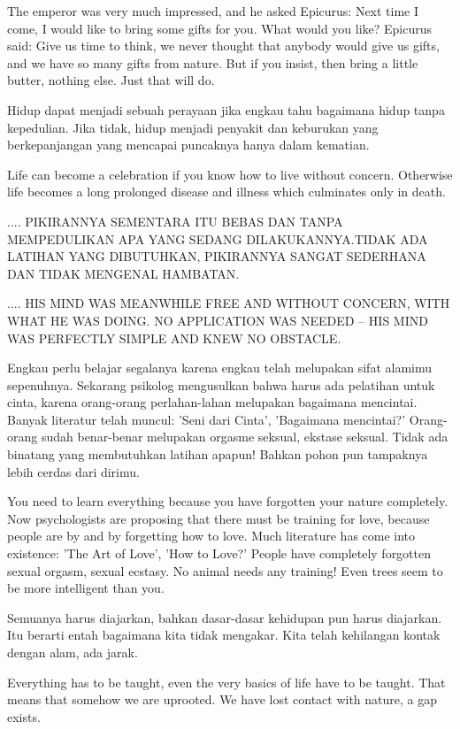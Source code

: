 \english
The emperor was very much impressed, and he asked Epicurus: Next time I come, I would like to bring some gifts for you. What would you like? Epicurus said: Give us time to think, we never thought that anybody would give us gifts, and we have so many gifts from nature. But if you insist, then bring a little butter, nothing else. Just that will do.

\bahasa
Hidup dapat menjadi sebuah perayaan jika engkau tahu bagaimana hidup tanpa kepedulian. Jika tidak, hidup menjadi penyakit dan keburukan yang berkepanjangan yang mencapai puncaknya hanya dalam kematian.

\english
Life can become a celebration if you know how to live without concern. Otherwise life becomes a long prolonged disease and illness which culminates only in death.

\bahasa
.... PIKIRANNYA SEMENTARA ITU BEBAS DAN TANPA MEMPEDULIKAN APA YANG SEDANG DILAKUKANNYA.TIDAK ADA LATIHAN YANG DIBUTUHKAN, PIKIRANNYA SANGAT SEDERHANA DAN TIDAK MENGENAL HAMBATAN.

\english
.... HIS MIND WAS MEANWHILE FREE AND WITHOUT CONCERN, WITH WHAT HE WAS DOING. NO APPLICATION WAS NEEDED – HIS MIND WAS PERFECTLY SIMPLE AND KNEW NO OBSTACLE.

\bahasa
Engkau perlu belajar segalanya karena engkau telah melupakan sifat alamimu sepenuhnya. Sekarang psikolog mengusulkan bahwa harus ada pelatihan untuk cinta, karena orang-orang perlahan-lahan melupakan bagaimana mencintai. Banyak literatur telah muncul: 'Seni dari Cinta', 'Bagaimana mencintai?' Orang-orang sudah benar-benar melupakan orgasme seksual, ekstase seksual. Tidak ada binatang yang membutuhkan latihan apapun! Bahkan pohon pun tampaknya lebih cerdas dari dirimu.


\english
You need to learn everything because you have forgotten your nature completely. Now psychologists are proposing that there must be training for love, because people are by and by forgetting how to love. Much literature has come into existence: 'The Art of Love', 'How to Love?' People have completely forgotten sexual orgasm, sexual ecstasy. No animal needs any training! Even trees seem to be more intelligent than you.

\bahasa
Semuanya harus diajarkan, bahkan dasar-dasar kehidupan pun harus diajarkan. Itu berarti entah bagaimana kita tidak mengakar. Kita telah kehilangan kontak dengan alam, ada jarak.

\english
Everything has to be taught, even the very basics of life have to be taught. That means that somehow we are uprooted. We have lost contact with nature, a gap exists.

